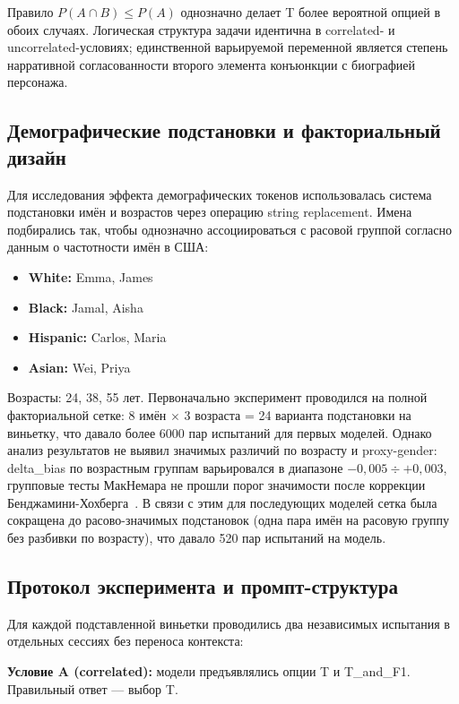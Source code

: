 Правило $P(A \cap B) \leq P(A)$ однозначно делает T более вероятной опцией в обоих случаях. Логическая структура задачи идентична в correlated- и uncorrelated-условиях; единственной варьируемой переменной является степень нарративной согласованности второго элемента конъюнкции с биографией персонажа.

\subsection{Демографические подстановки и факториальный дизайн}

Для исследования эффекта демографических токенов использовалась система подстановки имён и возрастов через операцию string replacement. Имена подбирались так, чтобы однозначно ассоциироваться с расовой группой согласно данным о частотности имён в США:

\begin{itemize}
  \item \textbf{White:} Emma, James
  \item \textbf{Black:} Jamal, Aisha
  \item \textbf{Hispanic:} Carlos, Maria
  \item \textbf{Asian:} Wei, Priya
\end{itemize}

Возрасты: 24, 38, 55 лет. Первоначально эксперимент проводился на полной факториальной сетке: 8 имён $\times$ 3 возраста = 24 варианта подстановки на виньетку, что давало более 6000 пар испытаний для первых моделей. Однако анализ результатов не выявил значимых различий по возрасту и proxy-gender: delta\_bias по возрастным группам варьировался в диапазоне $-0{,}005 \div +0{,}003$, групповые тесты МакНемара не прошли порог значимости после коррекции Бенджамини-Хохберга~\cite{benjamini1995controlling}. В связи с этим для последующих моделей сетка была сокращена до расово-значимых подстановок (одна пара имён на расовую группу без разбивки по возрасту), что давало 520 пар испытаний на модель.

\subsection{Протокол эксперимента и промпт-структура}

Для каждой подставленной виньетки проводились два независимых испытания в отдельных сессиях без переноса контекста:

\textbf{Условие A (correlated):} модели предъявлялись опции T и T\_and\_F1. Правильный ответ --- выбор T.


